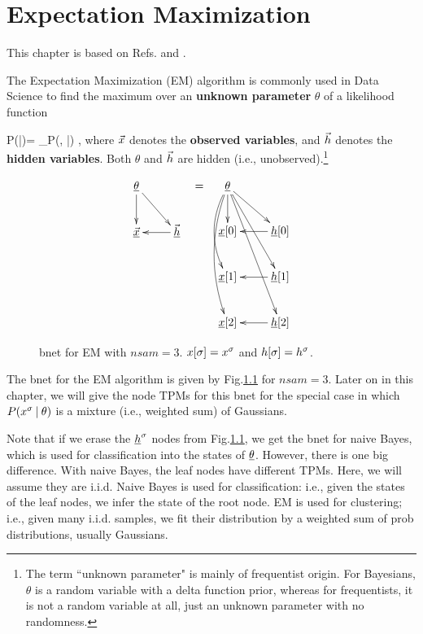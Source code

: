 \chapter{Expectation Maximization}
\label{ch-emax}

This chapter is based on 
Refs.\cite{wiki-em}
and \cite{emory-biostat}.

The Expectation Maximization (EM) 
algorithm 
is commonly used in Data Science 
to find the maximum
over an {\bf unknown parameter} $\theta$ of a
 likelihood function 

\beq
P(\vecx|\theta)=
\sum_\vech P(\vecx, \vech|\theta)
\;,
\eeq
where ${\vec{x}}$
denotes the {\bf observed variables},
and ${\vec{h}}$ denotes the
{\bf hidden variables}.
Both $\theta$
and ${\vec{h}}$
are hidden (i.e.,
unobserved).\footnote{
The term
``unknown parameter"
is mainly of frequentist origin.
For Bayesians, $\theta$
is a random variable with
a delta function prior,
whereas for frequentists,
it is not
a random variable at all, 
just an unknown parameter
with no randomness.}



\begin{figure}[h!]
\centering
$$\begin{array}{ccc}
\xymatrix{
\ul{\theta}\ar[d]\ar[dr]
\\
\ul{\vecx}&\ul{\vech}\ar[l]
}
&=&
\xymatrix{
\ul{\theta}
\ar[d]
\ar@/_1pc/[dd]
\ar@/_1pc/[ddd]
\ar[rd]\ar[rdd]\ar[rddd]
\\
\rvx[0]
&\rvh[0]\ar[l]
\\
\rvx[1]
&\rvh[1]\ar[l]
\\
\rvx[2]
&\rvh[2]\ar[l]
}
\end{array}
$$
\caption{bnet for EM with $nsam=3$.
$x[\sigma]=x^\sigma$ and $h[\sigma]=h^\sigma$.}
\label{fig-em-bnet}
\end{figure}


The bnet for the EM algorithm
is given by Fig.\ref{fig-em-bnet}
for $nsam=3$.
Later on in this chapter,
we will give the node TPMs
for this bnet for
the special
case in which $P(x^\sigma{\:\mathbf{|}\:} \theta)$
is a mixture (i.e., weighted sum)
of Gaussians.

Note that if we 
erase the ${\underline{h}}^\sigma$ nodes
from Fig.\ref{fig-em-bnet},
we get the bnet for naive Bayes,
which is used for classification
into the states of $\underline{\theta}$.
However, there is one big
difference. 
With naive Bayes,
the leaf nodes have
different TPMs.
Here, we will assume they are i.i.d.
Naive Bayes is used for classification: i.e., 
given the states 
of the leaf nodes,
we infer the state of the root node.
EM is used for clustering; i.e.,
given many i.i.d. samples,
we fit their distribution by a weighted sum
of prob distributions,
usually Gaussians.

